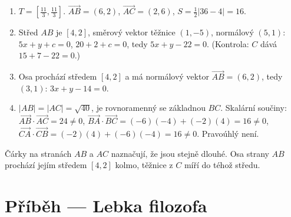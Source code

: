 \begin{solution}
  \begin{enumerate}[label=(\alph*)]
    \item $T = \left[\frac{11}{3}, \frac{11}{3}\right]$. $\overrightarrow{AB} = (6, 2)$, $\overrightarrow{AC} = (2, 6)$, $S = \frac{1}{2}|36 - 4| = 16$.
    \item Střed $AB$ je $[4, 2]$, směrový vektor těžnice $(1, -5)$, normálový $(5, 1)$: $5x + y + c = 0$, $20 + 2 + c = 0$, tedy $5x + y - 22 = 0$. (Kontrola: $C$ dává $15 + 7 - 22 = 0$.)
    \item Osa prochází středem $[4, 2]$ a má normálový vektor $\overrightarrow{AB} = (6, 2)$, tedy $(3, 1)$: $3x + y - 14 = 0$.
    \item $|AB| = |AC| = \sqrt{40}$, je rovnoramenný se základnou $BC$. Skalární součiny: $\overrightarrow{AB}\cdot\overrightarrow{AC} = 24\neq 0$, $\overrightarrow{BA}\cdot\overrightarrow{BC} = (-6)(-4) + (-2)(4) = 16\neq 0$, $\overrightarrow{CA}\cdot\overrightarrow{CB} = (-2)(4) + (-6)(-4) = 16\neq 0$. Pravoúhlý není.
  \end{enumerate}
  \begin{center}
  \end{center}
  Čárky na stranách $AB$ a $AC$ naznačují, že jsou stejně dlouhé. Osa strany $AB$ prochází jejím středem $[4, 2]$ kolmo, těžnice z $C$ míří do téhož středu.
\end{solution}

\section{Příběh --- Lebka filozofa}

